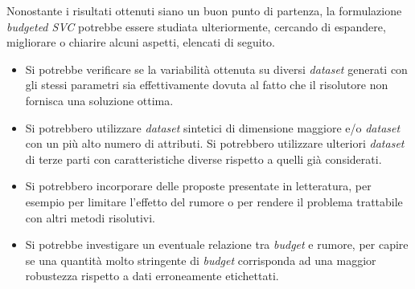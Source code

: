 Nonostante i risultati ottenuti siano un buon punto di partenza, la formulazione \emph{budgeted SVC} potrebbe essere studiata ulteriormente, cercando di espandere, migliorare o chiarire alcuni aspetti, elencati di seguito.
\begin{itemize}
    \item Si potrebbe verificare se la variabilità ottenuta su diversi \emph{dataset} generati con gli stessi parametri sia effettivamente dovuta al fatto che il risolutore non fornisca una soluzione ottima. 
    \item Si potrebbero utilizzare \emph{dataset} sintetici di dimensione maggiore e/o \emph{dataset} con un più alto numero di attributi. Si potrebbero utilizzare ulteriori \emph{dataset} di terze parti con caratteristiche diverse rispetto a quelli già considerati.
    \item Si potrebbero incorporare delle proposte presentate in letteratura, per esempio per limitare l'effetto del rumore o per rendere il problema trattabile con altri metodi risolutivi.
    \item Si potrebbe investigare un eventuale relazione tra \emph{budget} e rumore, per capire se una quantità molto stringente di \emph{budget} corrisponda ad una maggior robustezza rispetto a dati erroneamente etichettati.
\end{itemize}

